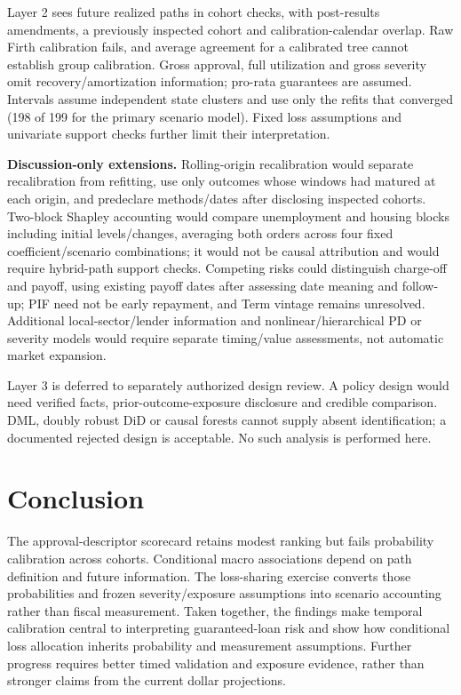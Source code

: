Layer 2 sees future realized paths in cohort checks, with post-results amendments, a previously inspected cohort and calibration-calendar overlap. Raw Firth calibration fails, and average agreement for a calibrated tree cannot establish group calibration. Gross approval, full utilization and gross severity omit recovery/amortization information; pro-rata guarantees are assumed. Intervals assume independent state clusters and use only the refits that converged (198 of 199 for the primary scenario model). Fixed loss assumptions and univariate support checks further limit their interpretation.

\textbf{Discussion-only extensions.} Rolling-origin recalibration would separate recalibration from refitting, use only outcomes whose windows had matured at each origin, and predeclare methods/dates after disclosing inspected cohorts. Two-block Shapley accounting would compare unemployment and housing blocks including initial levels/changes, averaging both orders across four fixed coefficient/scenario combinations; it would not be causal attribution and would require hybrid-path support checks. Competing risks could distinguish charge-off and payoff, using existing payoff dates after assessing date meaning and follow-up; PIF need not be early repayment, and Term vintage remains unresolved. Additional local-sector/lender information and nonlinear/hierarchical PD or severity models would require separate timing/value assessments, not automatic market expansion.

Layer 3 is deferred to separately authorized design review. A policy design would need verified facts, prior-outcome-exposure disclosure and credible comparison. DML, doubly robust DiD or causal forests cannot supply absent identification; a documented rejected design is acceptable. No such analysis is performed here.

\section{Conclusion}
The approval-descriptor scorecard retains modest ranking but fails probability calibration across cohorts. Conditional macro associations depend on path definition and future information. The loss-sharing exercise converts those probabilities and frozen severity/exposure assumptions into scenario accounting rather than fiscal measurement. Taken together, the findings make temporal calibration central to interpreting guaranteed-loan risk and show how conditional loss allocation inherits probability and measurement assumptions. Further progress requires better timed validation and exposure evidence, rather than stronger claims from the current dollar projections.

